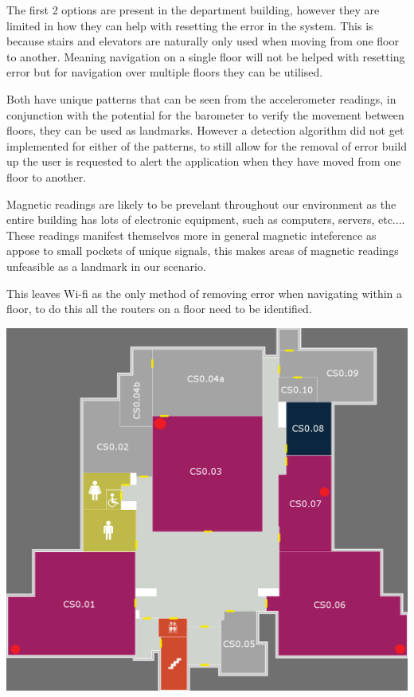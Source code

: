 \documentclass[12pt,a4paper]{report}
\begin{document}
The first 2 options are present in the department building, however they are limited in how they can help with resetting the error in the system. This is because stairs and elevators are naturally only used when moving from one floor to another. Meaning navigation on a single floor will not be helped with resetting error but for navigation over multiple floors they can be utilised. 

Both have unique patterns that can be seen from the accelerometer readings, in conjunction with the potential for the barometer to verify the movement between floors, they can be used as landmarks. However a detection algorithm did not get implemented for either of the patterns, to still allow for the removal of error build up the user is requested to alert the application when they have moved from one floor to another.

Magnetic readings are likely to be prevelant throughout our environment as the entire building has lots of electronic equipment, such as computers, servers, etc.... These readings manifest themselves more in general magnetic inteference as appose to small pockets of unique signals, this makes areas of magnetic readings unfeasible as a landmark in our scenario.

This leaves Wi-fi as the only method of removing error when navigating within a floor, to do this all the routers on a floor need to be identified.

\begin{center}
\includegraphics[scale=0.3]{images-implementation/wifiLocation.png}
\label{fig:wifiLoc}
\end{center}
\end{document}
